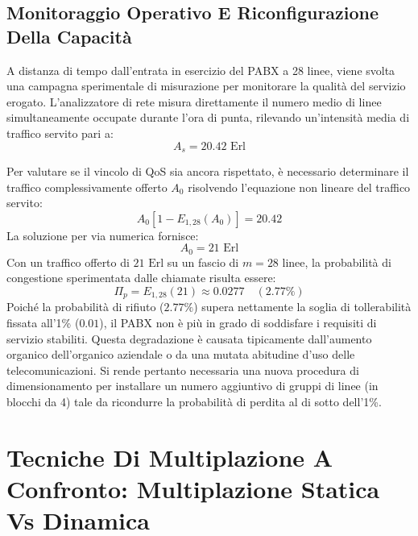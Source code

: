 \documentclass[11pt, a4paper]{article}
\begin{document}

\subsection{Monitoraggio Operativo E Riconfigurazione Della Capacità}

A distanza di tempo dall'entrata in esercizio del PABX a 28 linee, viene svolta una campagna sperimentale di misurazione per monitorare la qualità del servizio erogato. L'analizzatore di rete misura direttamente il numero medio di linee simultaneamente occupate durante l'ora di punta, rilevando un'intensità media di traffico servito pari a:
\[
A_s = 20.42\text{ Erl}
\]


Per valutare se il vincolo di QoS sia ancora rispettato, è necessario determinare il traffico complessivamente offerto $A_0$ risolvendo l'equazione non lineare del traffico servito:
\[
A_0 \left[ 1 - E_{1,28}(A_0) \right] = 20.42
\]
La soluzione per via numerica fornisce:
\[
A_0 = 21\text{ Erl}
\]
Con un traffico offerto di $21\text{ Erl}$ su un fascio di $m = 28$ linee, la probabilità di congestione sperimentata dalle chiamate risulta essere:
\[
\Pi_p = E_{1,28}(21) \approx 0.0277 \quad (2.77\%)
\]
Poiché la probabilità di rifiuto ($2.77\%$) supera nettamente la soglia di tollerabilità fissata all'1\% ($0.01$), il PABX non è più in grado di soddisfare i requisiti di servizio stabiliti. Questa degradazione è causata tipicamente dall'aumento organico dell'organico aziendale o da una mutata abitudine d'uso delle telecomunicazioni. Si rende pertanto necessaria una nuova procedura di dimensionamento per installare un numero aggiuntivo di gruppi di linee (in blocchi da 4) tale da ricondurre la probabilità di perdita al di sotto dell'1\%.


\newpage

\section{Tecniche Di Multiplazione A Confronto: Multiplazione Statica Vs Dinamica}
\end{document}
